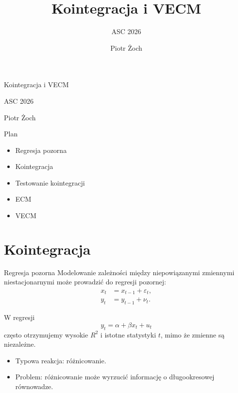 \documentclass[11pt,aspectratio=169,xcolor=dvipsnames]{beamer}
\title{Kointegracja i VECM}
\subtitle{ASC 2026}
\author{Piotr Żoch}
\date{}
\begin{document}
\begin{frame}[plain]
  \vspace{1.2cm}
  {Kointegracja i VECM\par}
  \vspace{0.35cm}
  {ASC 2026\par}
  \vspace{0.9cm}
  {Piotr Żoch\par}
\end{frame}

\begin{frame}{Plan}
  \begin{itemize}
    \item Regresja pozorna
    \item Kointegracja
    \item Testowanie kointegracji
    \item ECM
    \item VECM
  \end{itemize}
\end{frame}

\section{Kointegracja}

\begin{frame}{Regresja pozorna}
  \small
  Modelowanie zależności między niepowiązanymi zmiennymi niestacjonarnymi może prowadzić do regresji pozornej:
  \begin{align*}
    x_t &= x_{t-1} + \varepsilon_t,\\
    y_t &= y_{t-1} + \nu_t.
  \end{align*}

  W regresji
  \[
    y_t = \alpha + \beta x_t + u_t
  \]
  często otrzymujemy wysokie $R^2$ i istotne statystyki $t$, mimo że zmienne są niezależne.

  \begin{itemize}
    \item Typowa reakcja: różnicowanie.
    \item Problem: różnicowanie może wyrzucić informację o długookresowej równowadze.
  \end{itemize}
\end{frame}
\end{document}
